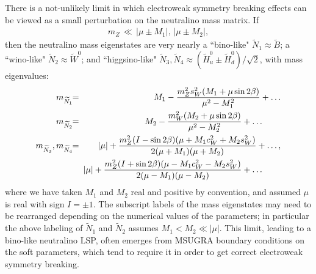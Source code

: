 \documentclass[11pt]{article}
\def\beq{\begin{eqnarray}}
\def\eeq{\end{eqnarray}}
\def\stilde{\widetilde}
\begin{document}
There is a not-unlikely limit in which electroweak symmetry breaking 
effects can be viewed as a small perturbation on the neutralino mass 
matrix. If
\beq
m_Z \,\ll\, |\mu \pm M_{1}|,\, |\mu \pm M_{2}| ,
\label{gauginolike}
\eeq
then the neutralino mass eigenstates are very nearly a ``bino-like" 
$\stilde N_1 \approx \stilde B$; a ``wino-like" $\stilde N_2 \approx 
\stilde W^0$; and ``higgsino-like" $\stilde N_3, \stilde N_4 \approx 
(\stilde H_u^0 \pm \stilde H_d^0)/\sqrt{2}$, with mass eigenvalues:
\beq
m_{{\stilde N}_1}\!\! &=&\!\! M_1 -
{ m_Z^2 s^2_W (M_1 + \mu \sin 2 \beta ) \over \mu^2 - M_1^2 }
+\ldots
\\
m_{{\stilde N}_2}\!\! &=&\!\! M_2 -
{ m_W^2 (M_2 + \mu \sin 2 \beta ) \over \mu^2 - M_2^2 }
+\ldots \qquad {}\\
m_{{\stilde N}_3}, m_{{\stilde N}_4}\!\! &=&\!\! |\mu|  +
{m_Z^2  (I - \sin 2 \beta) (\mu + M_1 c^2_W +M_2 s^2_W)
\over 2 (\mu + M_1) (\mu + M_2) }
+\ldots, \\
&&\!\!\! |\mu|  +
{m_Z^2  (I + \sin 2 \beta) (\mu - M_1 c^2_W - M_2 s^2_W)
\over 2 (\mu - M_1) (\mu - M_2) }
+\ldots \qquad {}
\eeq
where we have taken $M_1$ and $M_2$ real and positive by convention, and 
assumed $\mu$ is real with sign $I = \pm 1$. The subscript labels 
of the mass eigenstates may need to be rearranged depending on the 
numerical values of the parameters; in particular the above labeling of 
$\stilde N_1$ and $\stilde N_2$ assumes $M_1< M_2 \ll |\mu|$. This limit, 
leading to a bino-like neutralino LSP, often emerges from MSUGRA
boundary conditions on the soft 
parameters, which tend to 
require it in order to get correct electroweak symmetry breaking.
\end{document}
